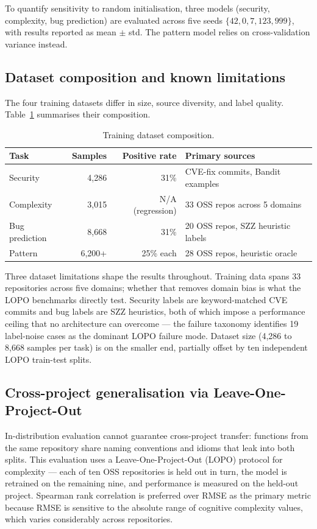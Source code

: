 \documentclass[12pt, oneside]{report}
\begin{document}
To quantify sensitivity to random initialisation, three models (security, complexity, bug prediction) are evaluated across five seeds $\{42, 0, 7, 123, 999\}$, with results reported as mean $\pm$ std. The pattern model relies on cross-validation variance instead.

\subsection{Dataset composition and known limitations}
\label{ssec:dataset-limits}

The four training datasets differ in size, source diversity, and label quality.
Table~\ref{tab:dataset-summary} summarises their composition.

\begin{table}[h]
\centering
\caption{Training dataset composition.}
\label{tab:dataset-summary}
\begin{tabular}{lrrl}
\hline
Task & Samples & Positive rate & Primary sources \\
\hline
Security & 4,286 & 31\% & CVE-fix commits, Bandit examples \\
Complexity & 3,015 & N/A (regression) & 33 OSS repos across 5 domains \\
Bug prediction & 8,668 & 31\% & 20 OSS repos, SZZ heuristic labels \\
Pattern & 6,200+ & 25\% each & 28 OSS repos, heuristic oracle \\
\hline
\end{tabular}
\end{table}

Three dataset limitations shape the results throughout. Training data spans 33 repositories across five domains; whether that removes domain bias is what the LOPO benchmarks directly test. Security labels are keyword-matched CVE commits and bug labels are SZZ heuristics, both of which impose a performance ceiling that no architecture can overcome — the failure taxonomy identifies 19 label-noise cases as the dominant LOPO failure mode. Dataset size (4,286 to 8,668 samples per task) is on the smaller end, partially offset by ten independent LOPO train-test splits.

\subsection{Cross-project generalisation via Leave-One-Project-Out}

In-distribution evaluation cannot guarantee cross-project transfer: functions from the same repository share naming conventions and idioms that leak into both splits. This evaluation uses a Leave-One-Project-Out (LOPO) protocol for complexity — each of ten OSS repositories is held out in turn, the model is retrained on the remaining nine, and performance is measured on the held-out project. Spearman rank correlation is preferred over RMSE as the primary metric because RMSE is sensitive to the absolute range of cognitive complexity values, which varies considerably across repositories.
\end{document}
